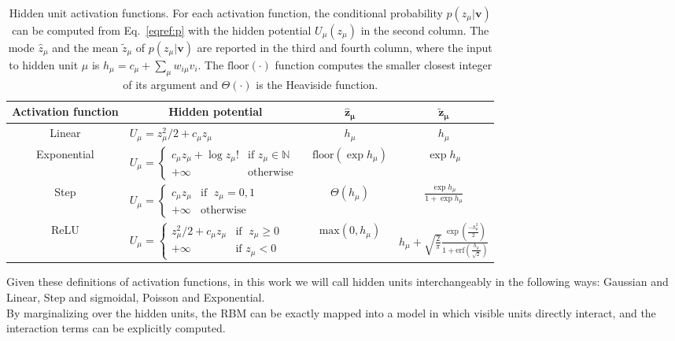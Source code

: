 \documentclass[11pt,letterpaper]{article}
\begin{document}
\begin{table}[htbp]
\centering
\begin{tabular}{|c|l|c|c|}
\hline
\multicolumn{1}{|c|}{\textbf{Activation function}} & \multicolumn{1}{|c|}{\textbf{Hidden potential}} & \multicolumn{1}{|c|}{ $\bm{\hat{z}_{\mu}}$ } & \multicolumn{1}{|c|}{ $\bm{\tilde{z}_{\mu}}$} \\ \hline
Linear &
$ U_{\mu}= z_{\mu}^2/2+ c_{\mu}z_{\mu}$  &  $h_{\mu}$ & $h_{\mu}$ \\ \hline
Exponential & 
$ U_{\mu}=
\begin{cases}
  c_{\mu}z_{\mu} +\log z_{\mu}! & \text{if } z_{\mu} \in \mathbb{N} \\
  +\infty & \text{otherwise }
\end{cases} 
$   & $\text{floor}(\exp h_{\mu})$ & $\exp h_{\mu}$\\ \hline
Step &
$ U_{\mu}=
\begin{cases}
  c_{\mu} z_{\mu} & \text{if } \; z_{\mu}=0,1 \\
  +\infty  & \text{otherwise}
\end{cases} 
$  & $\Theta(h_{\mu})$ & $\frac{\exp h_{\mu}}{1+ \exp{h_{\mu}}}$ \\ \hline
ReLU & 
$ U_{\mu}=
\begin{cases}
  z_{\mu}^2/2+ c_{\mu}z_{\mu} & \text{if }\; z_{\mu} \geq 0 \\
  +\infty  & \text{if } z_{\mu} < 0
\end{cases} 
$  & $\text{max}(0,h_{\mu})$ & $h_{\mu}+\sqrt{\frac{2}{\pi}}\frac{\exp\left( \frac{-h_{\mu}^2}{2}\right)}{1+\text{erf}\left(\frac{h_{\mu}}{\sqrt{2}}\right)}$ \\ \hline
\end{tabular}
\caption{Hidden unit activation functions. For each activation function, the conditional probability $p(z_{\mu}|\bm{v})$ can be computed from Eq.~\eqref{eqref:p} with the hidden potential $U_{\mu}(z_{\mu})$ in the second column. The mode $\hat{z}_{\mu}$ and the mean $\tilde{z}_{\mu}$ of $p(z_{\mu}|\bm{v})$ are reported in the third and fourth column, where the input to hidden unit $\mu$ is $h_{\mu}=c_{\mu}+\sum_{\mu}w_{i\mu}v_i$. The $\text{floor}(\cdot)$ function computes the smaller closest integer of its argument and $\Theta(\cdot)$ is the Heaviside function.}
\label{table1}
\end{table}
Given these definitions of activation functions, in this work we will call hidden units interchangeably in the following ways: Gaussian and Linear, Step and sigmoidal, Poisson and Exponential.\\
By marginalizing over the hidden units, the RBM can be exactly mapped into a model in which visible units directly interact, and the interaction terms can be explicitly computed.
\end{document}
